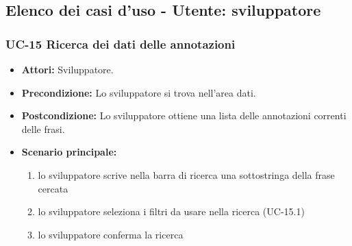\subsection{Elenco dei casi d'uso - Utente: sviluppatore}	

\subsubsection{UC-15 Ricerca dei dati delle annotazioni}
		\begin{itemize}
			\item \textbf{Attori:} Sviluppatore.
			\item \textbf{Precondizione:} Lo sviluppatore si trova nell'area dati.
			\item \textbf{Postcondizione:} Lo sviluppatore ottiene una lista delle annotazioni correnti delle frasi.
			\item \textbf{Scenario principale:}
				\begin{enumerate}
					\item lo sviluppatore scrive nella barra di ricerca una sottostringa della frase cercata
					\item lo sviluppatore seleziona i filtri da usare nella ricerca (UC-15.1)
					\item lo sviluppatore conferma la ricerca
				\end{enumerate}
		\end{itemize}
	
